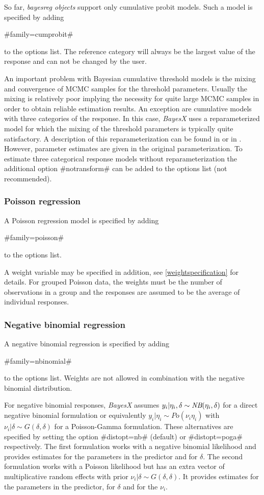 So far, {\em bayesreg objects} support only cumulative probit
models. Such a model is specified by adding

#family=cumprobit#

to the options list. The reference category will always be the
largest value of the response and can not be changed by the user.

An important problem with Bayesian cumulative threshold models is
the mixing and convergence of MCMC samples for the threshold
parameters. Usually the mixing is relatively poor implying the
necessity for quite large MCMC samples in order to obtain reliable
estimation results. An exception are cumulative models with three
categories of the response. In this case, {\em BayesX} uses a
reparameterized model for which the mixing of the threshold
parameters is typically quite satisfactory. A description of this
reparameterization can be found in  or in
. However, parameter estimates are given in the
original parameterization. To estimate three categorical response
models without reparameterization the additional option
#notransform# can be added to the options list (not recommended).

\subsubsection*{Poisson regression}

A Poisson regression model is specified by adding

#family=poisson#

to the options list.

A weight variable may be specified in addition, see
\autoref{weightspecification} for details. For grouped Poisson
data, the weights must be the number of observations in a group
and the responses are assumed to be the average of individual
responses.

\subsubsection*{Negative binomial regression}

A negative binomial regression is specified by adding

#family=nbinomial#

to the options list. Weights are not allowed in combination with
the negative binomial distribution.

For negative binomial responses, {\em BayesX} assumes $y_i |
\eta_i,\delta \sim \mbox{\it NB}(\eta_i,\delta)$ for a direct
negative binomial formulation or equivalently $y_i | \eta_i \sim
Po(\nu_i \eta_i)$ with $\nu_i|\delta \sim G(\delta, \delta)$ for a
Poisson-Gamma formulation. These alternatives are specified by
setting the option #distopt=nb# (default) or #distopt=poga#
respectively. The first formulation works with a negative binomial
likelihood and provides estimates for the parameters in the
predictor and for $\delta$. The second formulation works with a
Poisson likelihood but has an extra vector of multiplicative
random effects with prior $\nu_i|\delta \sim G(\delta, \delta)$.
It provides estimates for the parameters in the predictor, for
$\delta$ and for the $\nu_i$.

